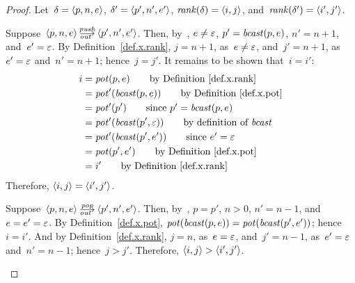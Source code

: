 
\lemxrankout*
\begin{proof}\strut
  Let~$\delta=\<p,n,e>$, $\delta'=\<p',n',e'>$,
  $\rank(\delta)=\<i,j>$, and~$\rank(\delta')=\<i',j'>$.
  \begin{enumerate:a}
  \item Suppose~$\<p,n,e>\outpush\<p',n',e'>$.  Then, by~,
    $e\ne\varepsilon$, $p'=\operatorname{\mathit{bcast}}(p,e)$, $n'=n+1$, and~$e'=\varepsilon$.  By
    Definition~\ref{def.x.rank}, $j=n+1$, as~$e\ne\varepsilon$, and~$j'=n+1$,
    as~$e'=\varepsilon$ and~$n'=n+1$; hence~$j=j'$.
    It remains to be shown that~$i=i'$:
    \begin{align*}
      i&=\pot(p,e)
         \tag*{by Definition~\ref{def.x.rank}}\\
       &=\pot'(\bcast(p,e))
         \tag*{by Definition~\ref{def.x.pot}}\\
       &=\pot'(p')
         \tag*{since~$p'=\bcast(p,e)$}\\
       &=\pot'(\bcast(p',\nil))
         \tag*{by definition of~$\bcast$}\\
       &=\pot'(\bcast(p',e'))
         \tag*{since~$e'=\nil$}\\
       &=\pot(p',e')
         \tag*{by Definition~\ref{def.x.pot}}\\
       &=i'
         \tag*{by Definition~\ref{def.x.rank}}
    \end{align*}
    Therefore, $\<i,j>=\<i',j'>$.

  \item Suppose~$\<p,n,e>\outpop\<p',n',e'>$.  Then, by~, $p=p'$,
    $n>0$, $n'=n-1$, and~$e=e'=\varepsilon$.
    By Definition~\ref{def.x.pot}, $\operatorname{\mathit{pot}}(\operatorname{\mathit{bcast}}(p,e))=\operatorname{\mathit{pot}}(\operatorname{\mathit{bcast}}(p',e'))$;
    hence~$i=i'$.  And by Definition~\ref{def.x.rank}, $j=n$, as~$e=\varepsilon$,
    and~$j'=n-1$, as~$e'=\varepsilon$ and~$n'=n-1$; hence~$j>j'$.
    Therefore, ${\<i,j>}>{\<i',j'>}$.\qedhere
  \end{enumerate:a}
\end{proof}

